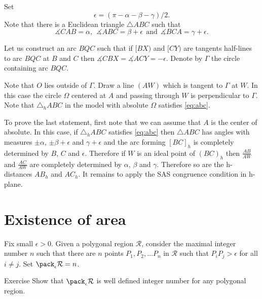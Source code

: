 {
Set 
$$\epsilon=(\pi-\alpha-\beta-\gamma)/2.$$
Note that there is a Euclidean triangle $\triangle ABC$ such that 
$$\measuredangle CAB=\alpha,\ \ \measuredangle ABC=\beta+\epsilon\ \ \text{and}\ \ \measuredangle BCA=\gamma+\epsilon.$$

Let us construct an arc $BQC$
such that if $[BX)$ and $[CY)$ are tangents half-lines to arc $BQC$
at $B$ and $C$ then $\measuredangle CBX=\measuredangle ACY=-\epsilon$.
Denote by $\Gamma$ the circle containing arc $BQC$.

Note that $O$ lies outside of $\Gamma$.
Draw a line $(AW)$ which is tangent to $\Gamma$ at $W$.
In this case the circle $\Omega$ centered at $A$  and passing through $W$
is perpendicular to $\Gamma$.
Note that $\triangle_h ABC$ in the model with absolute $\Omega$ satisfies \ref{eq:abc}. 

To prove the last statement, first note that we can assume that $A$ is the center of absolute.
In this case, if $\triangle_hABC$ satisfies \ref{eq:abc}
then $\triangle ABC$ has angles with measures 
$\pm \alpha$, $\pm \beta+\epsilon$ and $\gamma+\epsilon$
and the arc forming $[BC]_h$ is completely determined by  $B$, $C$ and $\epsilon$.
Therefore if $W$ is an ideal point of $(BC)_h$ then $\tfrac {AB}{AW}$ and $\tfrac {AC}{AW}$ are completely determined by $\alpha$, $\beta$ and $\gamma$.
Therefore so are the h-distances $AB_h$ and $AC_h$. 
It remains to apply the SAS congruence condition in h-plane.
\qeds












\section*{Existence of area}



Fix small $\epsilon>0$.
Given a polygonal region $\mathcal R$,
consider the maximal integer number $n$ such that there are $n$ points $P_1,P_2,\dots P_n$ in $\mathcal R$ such that $P_iP_j>\epsilon$ for all $i\ne j$.
Set $\pack_\epsilon \mathcal R=n$.

\begin{thm}{Exercise}
Show that $\pack_\epsilon \mathcal R$ is well defined integer number for any polygonal region.
\end{thm}

}
